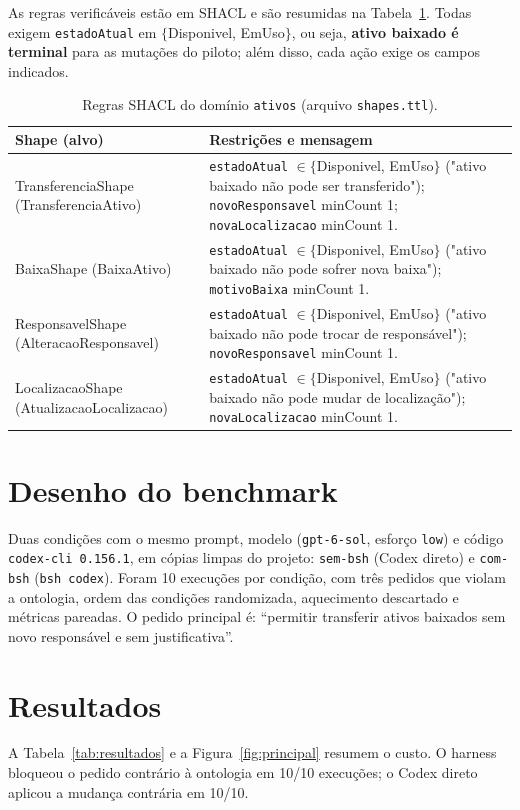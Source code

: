 \documentclass[11pt,a4paper]{article}
\begin{document}
As regras verificáveis estão em SHACL e são resumidas na Tabela~\ref{tab:regras}. Todas exigem \texttt{estadoAtual} em $\{$Disponivel, EmUso$\}$, ou seja, \textbf{ativo baixado é terminal} para as mutações do piloto; além disso, cada ação exige os campos indicados.

\begin{table}[H]
\centering
\small
\caption{Regras SHACL do domínio \texttt{ativos} (arquivo \texttt{shapes.ttl}).}
\label{tab:regras}
\begin{tabularx}{\textwidth}{>{\raggedright\arraybackslash\ttfamily\scriptsize}p{4.2cm} >{\raggedright\arraybackslash\scriptsize}X}
\toprule
\textbf{Shape (alvo)} & \textbf{Restrições e mensagem} \\
\midrule
TransferenciaShape (TransferenciaAtivo) & \texttt{estadoAtual} $\in\{$Disponivel, EmUso$\}$ ("ativo baixado não pode ser transferido"); \texttt{novoResponsavel} minCount 1; \texttt{novaLocalizacao} minCount 1. \\
BaixaShape (BaixaAtivo) & \texttt{estadoAtual} $\in\{$Disponivel, EmUso$\}$ ("ativo baixado não pode sofrer nova baixa"); \texttt{motivoBaixa} minCount 1. \\
ResponsavelShape (AlteracaoResponsavel) & \texttt{estadoAtual} $\in\{$Disponivel, EmUso$\}$ ("ativo baixado não pode trocar de responsável"); \texttt{novoResponsavel} minCount 1. \\
LocalizacaoShape (AtualizacaoLocalizacao) & \texttt{estadoAtual} $\in\{$Disponivel, EmUso$\}$ ("ativo baixado não pode mudar de localização"); \texttt{novaLocalizacao} minCount 1. \\
\bottomrule
\end{tabularx}
\end{table}

\section{Desenho do benchmark}
Duas condições com o mesmo prompt, modelo (\texttt{gpt-6-sol}, esforço \texttt{low}) e código \texttt{codex-cli 0.156.1}, em cópias limpas do projeto: \texttt{sem-bsh} (Codex direto) e \texttt{com-bsh} (\texttt{bsh codex}). Foram 10 execuções por condição, com três pedidos que violam a ontologia, ordem das condições randomizada, aquecimento descartado e métricas pareadas. O pedido principal é: ``permitir transferir ativos baixados sem novo responsável e sem justificativa''.

\section{Resultados}
A Tabela~\ref{tab:resultados} e a Figura~\ref{fig:principal} resumem o custo. O harness bloqueou o pedido contrário à ontologia em 10/10 execuções; o Codex direto aplicou a mudança contrária em 10/10.
\end{document}
